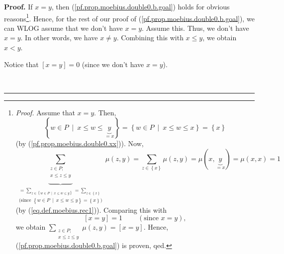 \documentclass[numbers=enddot,12pt,final,onecolumn,notitlepage]{scrartcl}%
\theoremstyle{definition}
\newenvironment{proof}[1][Proof]{\noindent\textbf{#1.} }{\ \rule{0.5em}{0.5em}}
\newenvironment{verlong}{}{}
\let\sumnonlimits\sum
\renewcommand{\sum}{\sumnonlimits\limits}
\begin{document}
\begin{verlong}
\begin{proof}
If $x=y$, then (\ref{pf.prop.moebius.double0.b.goal}) holds for obvious
reasons\footnote{\textit{Proof.} Assume that $x=y$. Then,%
\[
\left\{  w\in P\ \mid\ x\leq w\leq\underbrace{y}_{=x}\right\}  =\left\{  w\in
P\ \mid\ x\leq w\leq x\right\}  =\left\{  x\right\}
\]
(by (\ref{pf.prop.moebius.double0.xx})). Now,
\[
\underbrace{\sum_{\substack{z\in P;\\x\leq z\leq y}}}_{\substack{=\sum
_{z\in\left\{  w\in P\ \mid\ x\leq w\leq y\right\}  }=\sum_{z\in\left\{
x\right\}  }\\\text{(since }\left\{  w\in P\ \mid\ x\leq w\leq y\right\}
=\left\{  x\right\}  \text{)}}}\mu\left(  z,y\right)  =\sum_{z\in\left\{
x\right\}  }\mu\left(  z,y\right)  =\mu\left(  x,\underbrace{y}_{=x}\right)
=\mu\left(  x,x\right)  =1
\]
(by (\ref{eq.def.moebius.rec1})). Comparing this with
\[
\left[  x=y\right]  =1\ \ \ \ \ \ \ \ \ \ \left(  \text{since }x=y\right)  ,
\]
we obtain $\sum_{\substack{z\in P;\\x\leq z\leq y}}\mu\left(  z,y\right)
=\left[  x=y\right]  $. Hence, (\ref{pf.prop.moebius.double0.b.goal}) is
proven, qed.}. Hence, for the rest of our proof of
(\ref{pf.prop.moebius.double0.b.goal}), we can WLOG assume that we don't have
$x=y$. Assume this. Thus, we don't have $x=y$. In other words, we have $x\neq
y$. Combining this with $x\leq y$, we obtain $x<y$.

Notice that $\left[  x=y\right]  =0$ (since we don't have $x=y$).


\end{proof}
\end{verlong}
\end{document}
